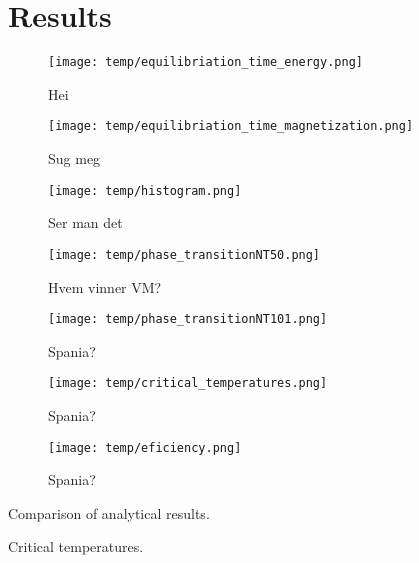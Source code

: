 \section{Results}\label{sec:results}


\begin{figure}[!ht]
    \texttt{[image: temp/equilibriation\_time\_energy.png]}
    \caption{Hei}
    \label{fig:equil_energy}
\end{figure} 



\begin{figure}[!ht]
    \texttt{[image: temp/equilibriation\_time\_magnetization.png]}
    \caption{Sug meg}
    \label{fig:equil_magn}
\end{figure}


\begin{figure}[!ht]
    \texttt{[image: temp/histogram.png]}
    \caption{Ser man det }
    \label{fig:histogram}
\end{figure}


\begin{figure}[!ht]
    \texttt{[image: temp/phase\_transitionNT50.png]} 
    \caption{Hvem vinner VM?}
    \label{fig:phase_transition}
\end{figure} 

\begin{figure}[!ht]
    \texttt{[image: temp/phase\_transitionNT101.png]} 
    \caption{Spania?}
    \label{fig:phase_transition_zoomed}
\end{figure} 

\begin{figure}[!ht]
    \texttt{[image: temp/critical\_temperatures.png]} 
    \caption{Spania?}
    \label{fig:critical_temperatures}
\end{figure} 

\begin{figure}[!ht]
    \texttt{[image: temp/eficiency.png]} 
    \caption{Spania?}
    \label{fig:efficiency}
\end{figure} 




\begin{table}[!ht]
    
    \caption{Comparison of analytical results. }
    \label{tab:compare_analytical}
\end{table}

\begin{table}[!ht]
    
    \caption{Critical temperatures.}
    \label{tab:critical_temperatures}
\end{table}

